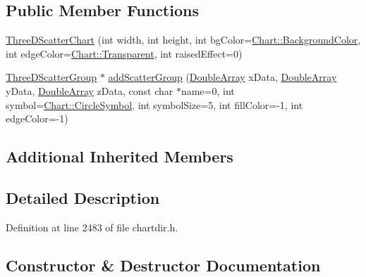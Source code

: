 \subsection*{Public Member Functions}
\begin{DoxyCompactItemize}
\item 
\hyperlink{class_three_d_scatter_chart_a085e949f6fc45a224416c6d7711d863e}{Three\+D\+Scatter\+Chart} (int width, int height, int bg\+Color=\hyperlink{namespace_chart_abee0d882fdc9ad0b001245ad9fc64011a134193bde693b9d152d0c6dc59fa7d7f}{Chart\+::\+Background\+Color}, int edge\+Color=\hyperlink{namespace_chart_abee0d882fdc9ad0b001245ad9fc64011afc6811800a9e2582dac0157b6279f836}{Chart\+::\+Transparent}, int raised\+Effect=0)
\item 
\hyperlink{class_three_d_scatter_group}{Three\+D\+Scatter\+Group} $\ast$ \hyperlink{class_three_d_scatter_chart_a1e40cc9fd47aa15d5d463be0c32801e1}{add\+Scatter\+Group} (\hyperlink{class_double_array}{Double\+Array} x\+Data, \hyperlink{class_double_array}{Double\+Array} y\+Data, \hyperlink{class_double_array}{Double\+Array} z\+Data, const char $\ast$name=0, int symbol=\hyperlink{namespace_chart_a5392f7ff9dd37b8e092b2fe17dfb7d05af88026815a91b6dc7ca265a5b540cf74}{Chart\+::\+Circle\+Symbol}, int symbol\+Size=5, int fill\+Color=-\/1, int edge\+Color=-\/1)
\end{DoxyCompactItemize}
\subsection*{Additional Inherited Members}


\subsection{Detailed Description}


Definition at line 2483 of file chartdir.\+h.



\subsection{Constructor \& Destructor Documentation}
\mbox{\label{class_three_d_scatter_chart_a085e949f6fc45a224416c6d7711d863e}} 
